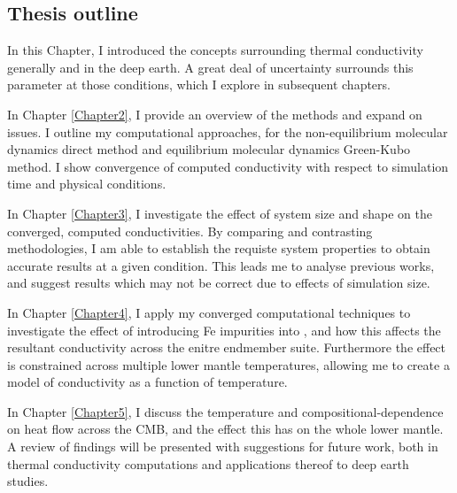 \subsection{Thesis outline}


In this Chapter, I introduced the concepts surrounding thermal conductivity generally and in the deep earth. A great deal of uncertainty surrounds this parameter at those conditions, which I explore in subsequent chapters.

In Chapter \ref{Chapter2}, I provide an overview of the methods and expand on issues. I outline my computational approaches, for the non-equilibrium molecular dynamics direct method and equilibrium molecular dynamics Green-Kubo method. I show convergence of computed conductivity with respect to simulation time and physical conditions.

In Chapter \ref{Chapter3}, I investigate the effect of system size and shape on the converged, computed conductivities. By comparing and contrasting methodologies, I am able to establish the requiste system properties to obtain accurate results at a given condition. This leads me to analyse previous works, and suggest results which may not be correct due to effects of simulation size.

In Chapter \ref{Chapter4}, I apply my converged computational techniques to investigate the effect of introducing Fe impurities into \bdg, and how this affects the resultant conductivity across the enitre endmember suite. Furthermore the effect is constrained across multiple lower mantle temperatures, allowing me to create a model of \mgfesios conductivity as a function of temperature.

In Chapter \ref{Chapter5}, I discuss the temperature and compositional-dependence on heat flow across the CMB, and the effect this has on the whole lower mantle. A review of findings will be presented with suggestions for future work, both in thermal conductivity computations and applications thereof to deep earth studies.



